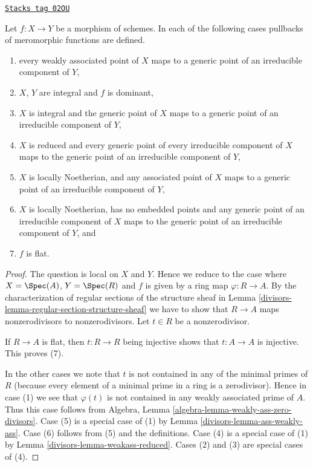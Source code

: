 \begin{lemma}
\label{divisors-lemma-pullback-meromorphic-sections-defined}
\href{https://stacks.math.columbia.edu/tag/02OU}{\texttt{Stacks tag 02OU}}

Let $f : X \to Y$ be a morphism of schemes.
In each of the following cases pullbacks of meromorphic
functions are defined.
\begin{enumerate}
\item every weakly associated point of $X$ maps to
a generic point of an irreducible component of $Y$,
\item $X$, $Y$ are integral and $f$ is dominant,
\item $X$ is integral and the generic point of $X$ maps
to a generic point of an irreducible component of $Y$,
\item $X$ is reduced and every generic point of every irreducible
component of $X$ maps to the generic point of an irreducible component
of $Y$,
\item $X$ is locally Noetherian, and any associated point of
$X$ maps to a generic point of an irreducible component of $Y$,
\item $X$ is locally Noetherian, has no embedded points and
any generic point of an irreducible component of
$X$ maps to the generic point of an irreducible component of $Y$, and
\item $f$ is flat.
\end{enumerate}
\end{lemma}

\begin{proof}

The question is local on $X$ and $Y$. Hence we reduce to the case where
$X = \Spec(A)$, $Y = \Spec(R)$ and $f$ is given by a ring map
$\varphi : R \to A$.
By the characterization of regular sections of the structure sheaf
in Lemma \ref{divisors-lemma-regular-section-structure-sheaf} we have to
show that $R \to A$ maps nonzerodivisors to nonzerodivisors.
Let $t \in R$ be a nonzerodivisor.

\medskip\noindent
If $R \to A$ is flat, then $t : R \to R$ being injective
shows that $t : A \to A$ is injective. This proves (7).

\medskip\noindent
In the other cases we note that $t$ is not contained in any of
the minimal primes of $R$ (because every element of a minimal
prime in a ring is a zerodivisor).
Hence in case (1) we see that $\varphi(t)$ is not contained
in any weakly associated prime of $A$. Thus this case follows from
Algebra, Lemma \ref{algebra-lemma-weakly-ass-zero-divisors}.
Case (5) is a special case of (1) by Lemma \ref{divisors-lemma-ass-weakly-ass}.
Case (6) follows from (5) and the definitions.
Case (4) is a special case of (1) by
Lemma \ref{divisors-lemma-weakass-reduced}.
Cases (2) and (3) are special cases of (4).
\end{proof}


